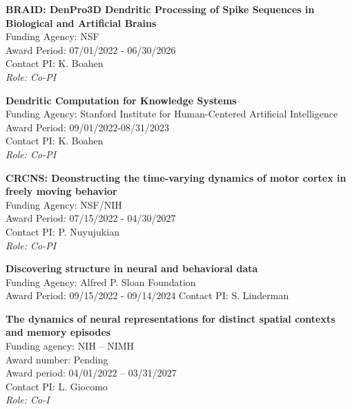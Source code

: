\documentclass[10pt]{article}
\begin{document}
\begin{outerlist}
\item \textbf{BRAID: DenPro3D Dendritic Processing of Spike Sequences in Biological and Artificial Brains} \\
  Funding Agency: NSF \\
  Award Period: 07/01/2022 - 06/30/2026\\
  Contact PI: K. Boahen\\
  \textit{Role: Co-PI}
  
\item \textbf{Dendritic Computation for Knowledge Systems} \\
  Funding Agency: Stanford Institute for Human-Centered Artificial Intelligence \\
  Award Period: 09/01/2022-08/31/2023\\
  Contact PI: K. Boahen \\
  \textit{Role: Co-PI}
  
\item \textbf{CRCNS: Deonstructing the time-varying dynamics of motor cortex in freely moving behavior} \\
  Funding Agency: NSF/NIH \\
  Award Period: 07/15/2022 - 04/30/2027 \\
  Contact  PI: P. Nuyujukian \\
  \textit{Role: Co-PI}
  
\item \textbf{Discovering structure in neural and behavioral data} \\
  Funding Agency: Alfred P. Sloan Foundation \\
  Award Period: 09/15/2022 - 09/14/2024
  Contact PI: S. Linderman
  
  
\item \textbf{The dynamics of neural representations for distinct spatial contexts and memory episodes} \\
  Funding agency: NIH – NIMH \\
  Award number: Pending \\
  Award period: 04/01/2022 – 03/31/2027 \\
  Contact PI: L. Giocomo  \\
  \textit{Role: Co-I}


\end{outerlist}
\end{document}

